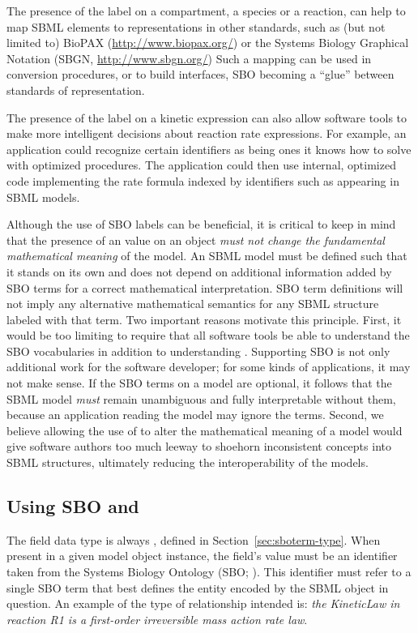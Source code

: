 The presence of the label on a compartment, a species or a reaction, can help to map SBML elements to representations in other standards, such as (but not limited to) BioPAX (\url{http://www.biopax.org/}) or the Systems Biology Graphical Notation (SBGN, \url{http://www.sbgn.org/})  Such a mapping can be used in conversion procedures, or to build interfaces, SBO becoming a ``glue'' between standards of representation.

The presence of the label on a kinetic expression can also allow
software tools to make more intelligent decisions about reaction
rate expressions.  For example, an application could recognize
certain identifiers as being ones it knows how to solve with
optimized procedures.  The application could then use internal,
optimized code implementing the rate formula indexed by
identifiers such as  appearing in SBML models.

Although the use of SBO labels can be beneficial, it is critical
to keep in mind that the presence of an  value on
an object \emph{must not change the fundamental mathematical
  meaning} of the model.  An SBML model must be defined such that
it stands on its own and does not depend on additional information
added by SBO terms for a correct mathematical interpretation.  SBO
term definitions will not imply any alternative mathematical
semantics for any SBML structure labeled with that term.  Two
important reasons motivate this principle.  First, it would be too
limiting to require that all software tools be able to understand
the SBO vocabularies in addition to understanding \sbmltwothree	.
Supporting SBO is not only additional work for the software
developer; for some kinds of applications, it may not make sense.
If the SBO terms on a model are optional, it follows that the SBML
model \emph{must} remain unambiguous and fully interpretable
without them, because an application reading the model may ignore
the terms.  Second, we believe allowing the use of 
to alter the mathematical meaning of a model would give software
authors too much leeway to shoehorn inconsistent concepts into
SBML structures, ultimately reducing the interoperability of the
models.

\subsection{Using SBO and }

The  field data type is always ,
defined in Section~\ref{sec:sboterm-type}.  When present in a
given model object instance, the field's value must be an
identifier taken from the Systems Biology Ontology (SBO; \sboref).
This identifier must refer to a single SBO term that best defines
the entity encoded by the SBML object in question.  An example of
the type of relationship intended is: \emph{the KineticLaw in
  reaction R1 is a first-order irreversible mass action rate law}.

